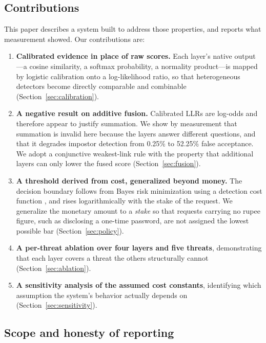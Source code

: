 \documentclass[conference]{IEEEtran}
\begin{document}
\subsection{Contributions}

This paper describes a system built to address those properties, and reports
what measurement showed. Our contributions are:

\begin{enumerate}
\item \textbf{Calibrated evidence in place of raw scores.} Each layer's native
output---a cosine similarity, a softmax probability, a normality product---is
mapped by logistic calibration onto a log-likelihood ratio, so that
heterogeneous detectors become directly comparable and combinable
(Section~\ref{sec:calibration}).

\item \textbf{A negative result on additive fusion.} Calibrated LLRs are
log-odds and therefore appear to justify summation. We show by measurement that
summation is invalid here because the layers answer different questions, and
that it degrades impostor detection from 0.25\% to 52.25\% false acceptance. We
adopt a conjunctive weakest-link rule with the property that additional layers
can only lower the fused score (Section~\ref{sec:fusion}).

\item \textbf{A threshold derived from cost, generalized beyond money.} The
decision boundary follows from Bayes risk minimization using a detection cost
function \cite{kinnunen2018tdcf}, and rises logarithmically with the stake of
the request. We generalize the monetary amount to a \emph{stake} so that
requests carrying no rupee figure, such as disclosing a one-time password, are
not assigned the lowest possible bar (Section~\ref{sec:policy}).

\item \textbf{A per-threat ablation over four layers and five threats},
demonstrating that each layer covers a threat the others structurally cannot
(Section~\ref{sec:ablation}).

\item \textbf{A sensitivity analysis of the assumed cost constants},
identifying which assumption the system's behavior actually depends on
(Section~\ref{sec:sensitivity}).
\end{enumerate}

\subsection{Scope and honesty of reporting}
\end{document}
